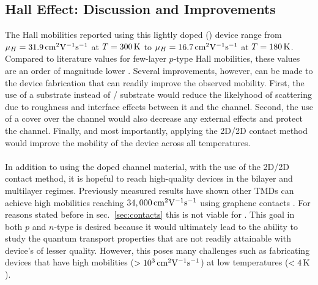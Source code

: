 \subsection{Hall Effect: Discussion and Improvements}\label{subsec:hall_improvements}
The Hall mobilities reported using this lightly doped (\lightlyfive) device range from $\mu_H=31.9\,\mathrm{cm}^{2}\mathrm{V}^{-1}\mathrm{s}^{-1}$ at $T=300\,\mathrm{K}$ to $\mu_H=16.7\,\mathrm{cm}^{2}\mathrm{V}^{-1}\mathrm{s}^{-1}$ at $T=180\,\mathrm{K}$. Compared to literature values for few-layer $p$-type  Hall mobilities, these values are an order of magnitude lower \cite{Pradhan_SciReports2015}. Several improvements, however, can be made to the device fabrication that can readily improve the observed mobility. First, the use of a \hbn substrate instead of / substrate would reduce the likelyhood of scattering due to roughness and interface effects between it and the channel. Second, the use of a \hbn cover over the channel would also decrease any external effects and protect the channel. Finally, and most importantly, applying the 2D/2D contact method would improve the mobility of the device across all temperatures. \\ \\
In addition to using the doped channel material, with the use of the 2D/2D contact method, it is hopeful to reach high-quality devices in the bilayer and multilayer regimes. Previously measured results have shown other \acp{TMD} can achieve high mobilities reaching $34,000\,\mathrm{cm}^{2}\mathrm{V}^{-1}\mathrm{s}^{-1}$ using graphene contacts \cite{Li_NatureNano2015}. For reasons stated before in sec.~\ref{sec:contacts} this is not viable for . This goal in both $p$ and $n$-type  is desired because it would ultimately lead to the ability to study the quantum transport properties that are not readily attainable with device's of lesser quality. However, this poses many challenges such as fabricating devices that have high mobilities ($>10^{3}\,\mathrm{cm}^{2}\mathrm{V}^{-1}\mathrm{s}^{-1}$) at low temperatures ($<4\,\mathrm{K}$).


